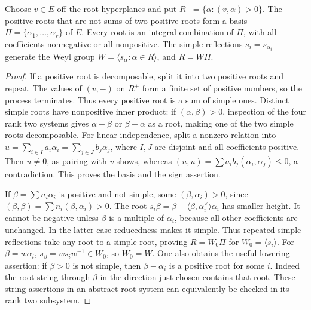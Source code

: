 \begin{theorem}\label{res:E02}
Choose \(v\in E\) off the root hyperplanes and put
\(R^+=\{\alpha:(v,\alpha)>0\}\). The positive roots that are
not sums of two positive roots form a basis
\(\Pi=\{\alpha_1,\ldots,\alpha_r\}\) of \(E\).
Every root is an integral combination of \(\Pi\), with all
coefficients nonnegative or all nonpositive.
The simple reflections \(s_i=s_{\alpha_i}\) generate the Weyl
group \(W=\langle s_\alpha:\alpha\in R\rangle\), and
\(R=W\Pi\).
\end{theorem}
\begin{proof}
If a positive root is decomposable, split it into two positive
roots and repeat. The values of \((v,-)\) on \(R^+\) form a
finite set of positive numbers, so the process terminates.
Thus every positive root is a sum of simple ones.
Distinct simple roots have nonpositive inner product: if
\((\alpha,\beta)>0\), inspection of the four rank two systems
gives \(\alpha-\beta\) or \(\beta-\alpha\) as a root, making
one of the two simple roots decomposable.
For linear independence, split a nonzero relation into
\(u=\sum_{i\in I}a_i\alpha_i=\sum_{j\in J}b_j\alpha_j\),
where \(I,J\) are disjoint and all coefficients positive.
Then \(u\ne0\), as pairing with \(v\) shows, whereas
\((u,u)=\sum a_ib_j(\alpha_i,\alpha_j)\le0\), a contradiction.
This proves the basis and the sign assertion.

If \(\beta=\sum n_i\alpha_i\) is positive and not simple,
some \((\beta,\alpha_i)>0\), since
\((\beta,\beta)=\sum n_i(\beta,\alpha_i)>0\).
The root \(s_i\beta=\beta-
\langle\beta,\alpha_i^\vee\rangle\alpha_i\)
has smaller height. It cannot be negative unless \(\beta\)
is a multiple of \(\alpha_i\), because all other coefficients
are unchanged. In the latter case reducedness makes it simple.
Thus repeated simple reflections take any root to a simple
root, proving \(R=W_0\Pi\) for \(W_0=\langle s_i\rangle\).
For \(\beta=w\alpha_i\), \(s_\beta=ws_iw^{-1}\in W_0\),
so \(W_0=W\).
One also obtains the useful lowering assertion:
if \(\beta>0\) is not simple, then \(\beta-\alpha_i\)
is a positive root for some \(i\). Indeed the root string
through \(\beta\) in the direction just chosen contains that
root. These string assertions in an abstract root system
can equivalently be checked in its rank two subsystem.
\end{proof}

